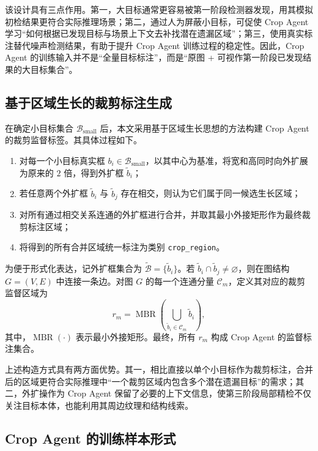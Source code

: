 该设计具有三点作用。第一，大目标通常更容易被第一阶段检测器发现，用其模拟初检结果更符合实际推理场景；第二，通过人为屏蔽小目标，可促使 Crop Agent 学习“如何根据已发现目标与场景上下文去补找潜在遗漏区域”；第三，使用真实标注替代噪声检测结果，有助于提升 Crop Agent 训练过程的稳定性。因此，Crop Agent 的训练输入并不是“全量目标标注”，而是“原图 + 可视作第一阶段已发现结果的大目标集合”。

\subsection{基于区域生长的裁剪标注生成}

在确定小目标集合 $\mathcal{B}_{\mathrm{small}}$ 后，本文采用基于区域生长思想的方法构建 Crop Agent 的裁剪监督标签。其具体过程如下。
\begin{enumerate}
    \item 对每一个小目标真实框 $b_i \in \mathcal{B}_{\mathrm{small}}$，以其中心为基准，将宽和高同时向外扩展为原来的 $2$ 倍，得到外扩框 $\tilde{b}_i$；
    \item 若任意两个外扩框 $\tilde{b}_i$ 与 $\tilde{b}_j$ 存在相交，则认为它们属于同一候选生长区域；
    \item 对所有通过相交关系连通的外扩框进行合并，并取其最小外接矩形作为最终裁剪标注区域；
    \item 将得到的所有合并区域统一标注为类别 \texttt{crop\_region}。
\end{enumerate}

为便于形式化表达，记外扩框集合为 $\tilde{\mathcal{B}}=\{\tilde{b}_i\}$。若 $\tilde{b}_i \cap \tilde{b}_j \neq \varnothing$，则在图结构 $G=(V,E)$ 中连接一条边。对图 $G$ 的每一个连通分量 $\mathcal{C}_m$，定义其对应的裁剪监督区域为
\begin{equation}
r_m = \operatorname{MBR}\left( \bigcup_{\tilde{b}_i \in \mathcal{C}_m} \tilde{b}_i \right),
\label{eq:crop_region_gt}
\end{equation}
其中，$\operatorname{MBR}(\cdot)$ 表示最小外接矩形。最终，所有 $r_m$ 构成 Crop Agent 的监督标注集合。

上述构造方式具有两方面优势。其一，相比直接以单个小目标作为裁剪标注，合并后的区域更符合实际推理中“一个裁剪区域内包含多个潜在遗漏目标”的需求；其二，外扩操作为 Crop Agent 保留了必要的上下文信息，使第三阶段局部精检不仅关注目标本体，也能利用其周边纹理和结构线索。

\subsection{Crop Agent 的训练样本形式}

